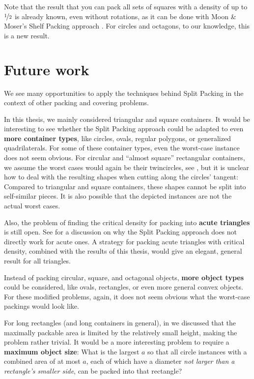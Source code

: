 \documentclass[a4paper,style=print,bibliography=totoc,nexus,lnum,extramargin]{tubsbook}
\begin{document}
Note that the result that you can pack all sets of squares with a density of up to $\nicefrac 1 2$ is already known, even without rotations, as it can be done with Moon \& Moser's Shelf Packing approach \cite{MM1967some}. For circles and octagons, to our knowledge, this is a new result.

\chapter{Future work}\label{ch:future-work}

We see many opportunities to apply the techniques behind Split Packing in the context of other packing and covering problems.

In this thesis, we mainly considered triangular and square containers. It would be interesting to see whether the Split Packing approach could be adapted to even \textbf{more container types}, like circles, ovals, regular polygons, or generalized quadrilaterals. For some of these container types, even the worst-case instance does not seem obvious. For circular and “almost square” rectangular containers, we assume the worst cases would again be their twincircles, see , but it is unclear how to deal with the resulting shapes when cutting along the circles' tangent: Compared to triangular and square containers, these shapes cannot be split into self-similar pieces. It is also possible that the depicted instances are not the actual worst cases.


Also, the problem of finding the critical density for packing into \textbf{acute triangles} is still open. See  for a discussion on why the Split Packing approach does not directly work for acute ones. A strategy for packing acute triangles with critical density, combined with the results of this thesis, would give an elegant, general result for all triangles.

Instead of packing circular, square, and octagonal objects, \textbf{more object types} could be considered, like ovals, rectangles, or even more general convex objects. For these modified problems, again, it does not seem obvious what the worst-case packings would look like.

For long rectangles (and long containers in general), in  we discussed that the maximally packable area is limited by the relatively small height, making the problem rather trivial. It would be a more interesting problem to require a \textbf{maximum object size}: What is the largest $a$ so that all circle instances with a combined area of at most $a$, each of which have a diameter \emph{not larger than a rectangle's smaller side}, can be packed into that rectangle?
\end{document}
